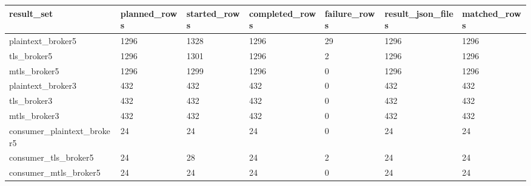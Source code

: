 \begin{tabular}{lllllll}
\hline
result\_set & planned\_rows & started\_rows & completed\_rows & failure\_rows & result\_json\_files & matched\_rows \\
\hline
plaintext\_broker5 & 1296 & 1328 & 1296 & 29 & 1296 & 1296 \\
tls\_broker5 & 1296 & 1301 & 1296 & 2 & 1296 & 1296 \\
mtls\_broker5 & 1296 & 1299 & 1296 & 0 & 1296 & 1296 \\
plaintext\_broker3 & 432 & 432 & 432 & 0 & 432 & 432 \\
tls\_broker3 & 432 & 432 & 432 & 0 & 432 & 432 \\
mtls\_broker3 & 432 & 432 & 432 & 0 & 432 & 432 \\
consumer\_plaintext\_broker5 & 24 & 24 & 24 & 0 & 24 & 24 \\
consumer\_tls\_broker5 & 24 & 28 & 24 & 2 & 24 & 24 \\
consumer\_mtls\_broker5 & 24 & 24 & 24 & 0 & 24 & 24 \\
\hline
\end{tabular}
